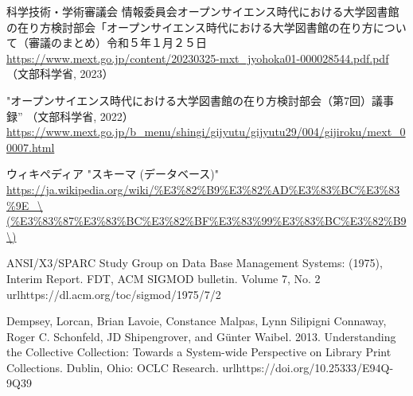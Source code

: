 \documentclass[submit,noauthor]{ono}
\begin{document}
	
	\begin{thebibliography}{}
		
	
	科学技術・学術審議会 情報委員会オープンサイエンス時代における大学図書館の在り方検討部会「オープンサイエンス時代における大学図書館の在り方について（審議のまとめ）令和５年１月２５日 \url{https://www.mext.go.jp/content/20230325-mxt_jyohoka01-000028544.pdf.pdf}（文部科学省, 2023）

	"オープンサイエンス時代における大学図書館の在り方検討部会（第7回）議事録” （文部科学省, 2022）
	\url{https://www.mext.go.jp/b_menu/shingi/gijyutu/gijyutu29/004/gijiroku/mext_00007.html}
	
	
	ウィキペディア "スキーマ (データベース)" 
	\url{https://ja.wikipedia.org/wiki/%E3%82%B9%E3%82%AD%E3%83%BC%E3%83%9E_\(%E3%83%87%E3%83%BC%E3%82%BF%E3%83%99%E3%83%BC%E3%82%B9\)}

	ANSI/X3/SPARC Study Group on Data Base Management Systems: (1975), Interim Report. FDT, ACM SIGMOD bulletin. Volume 7, No. 2 
	url{https://dl.acm.org/toc/sigmod/1975/7/2}

	Dempsey, Lorcan, Brian Lavoie, Constance Malpas, Lynn Silipigni Connaway, Roger C.
Schonfeld, JD Shipengrover, and Günter Waibel. 2013. Understanding the Collective
Collection: Towards a System-wide Perspective on Library Print Collections. Dublin,
Ohio: OCLC Research.
	url{https://doi.org/10.25333/E94Q-9Q39}

	
		
		
		
		
		
	\end{thebibliography}
		

	
	
	
	
\end{document}
